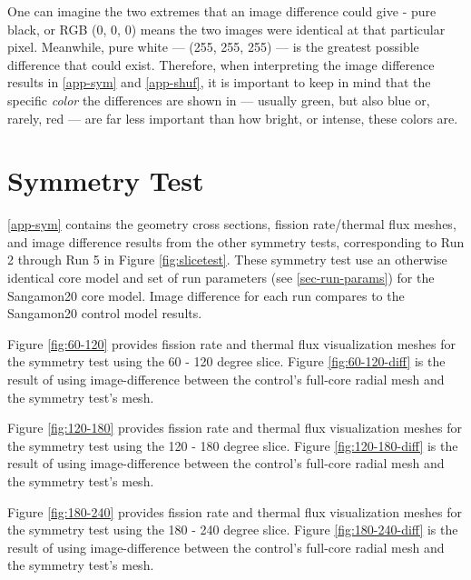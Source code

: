 One can imagine the two extremes that an image difference could give - pure black, or RGB (0, 0, 0) means the two images were identical at that particular pixel.  Meanwhile, pure white --- (255, 255, 255) --- is the greatest possible difference that could exist.  Therefore, when interpreting the image difference results in \autoref{app-sym} and \autoref{app-shuf}, it is important to keep in mind that the specific \emph{color} the differences are shown in --- usually green, but also blue or, rarely, red --- are far less important than how bright, or intense, these colors are.

\section{Symmetry Test}
\label{app-sym}

\autoref{app-sym} contains the geometry cross sections, fission rate/thermal flux meshes, and image difference results from the other symmetry tests, corresponding to Run 2 through Run 5 in Figure \ref{fig:slicetest}.  These symmetry test use an otherwise identical core model and set of run parameters (see \autoref{sec-run-params}) for the Sangamon20 core model.  Image difference for each run compares to the Sangamon20 control model results.





Figure \ref{fig:60-120} provides fission rate and thermal flux visualization meshes for the symmetry test using the 60 - 120 degree slice.  Figure \ref{fig:60-120-diff} is the result of using image-difference between the control's full-core radial mesh and the symmetry test's mesh.




Figure \ref{fig:120-180} provides fission rate and thermal flux visualization meshes for the symmetry test using the 120 - 180 degree slice.  Figure \ref{fig:120-180-diff} is the result of using image-difference between the control's full-core radial mesh and the symmetry test's mesh.




Figure \ref{fig:180-240} provides fission rate and thermal flux visualization meshes for the symmetry test using the 180 - 240 degree slice.  Figure \ref{fig:180-240-diff} is the result of using image-difference between the control's full-core radial mesh and the symmetry test's mesh.




